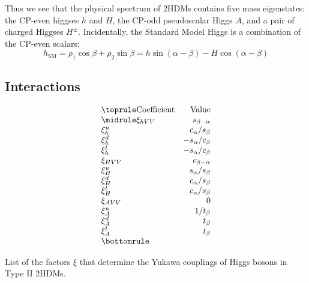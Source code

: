 Thus we see that the physical spectrum of $2$HDMs contains five mass eigenstates: the CP-even higgses $h$ and $H$, the CP-odd pseudoscalar Higgs $A$, and a pair of charged Higgses $H^\pm$. Incidentally, the Standard Model Higgs is a combination of the CP-even scalars:
\begin{equation}
h_\text{SM} = \rho_1\cos\beta + \rho_2\sin\beta = h\sin(\alpha-\beta)-H\cos(\alpha-\beta)
\label{eq:h_SM}
\end{equation}


\subsection{Interactions}

\newcommand{\sbma}{s_{\beta-\alpha}}
\newcommand{\cbma}{c_{\beta-\alpha}}
\newcommand{\casb}{c_\alpha/s_\beta}
\newcommand{\sacb}{s_\alpha/c_\beta}
\newcommand{\sasb}{s_\alpha/s_\beta}

\begin{margintable}[-5cm]
  \[
    \begin{array}{lr}
      \toprule
      \text{Coefficient}       & \text{Value} \\
      \midrule
      \xi_{hVV}   & \sbma          \\
      \xi_{h}^u   & \casb          \\
      \xi_{h}^d   & -\sacb         \\
      \xi_{h}^l   & -\sacb         \\
      \xi_{HVV}   & \cbma          \\
      \xi_{H}^u   & \sasb          \\
      \xi_{H}^d   & \casb          \\
      \xi_{H}^l   & \casb          \\
      \xi_{AVV}   & 0              \\
      \xi_{A}^u   & 1/t_\beta      \\
      \xi_{A}^d   & t_\beta        \\
      \xi_{A}^l   & t_\beta\\      
      \bottomrule
\end{array}
\]
\caption{List of the factors $\xi$ that determine the Yukawa couplings of Higgs bosons in Type II $2$HDMs.}
\label{tab:xi_factors}
\end{margintable}

